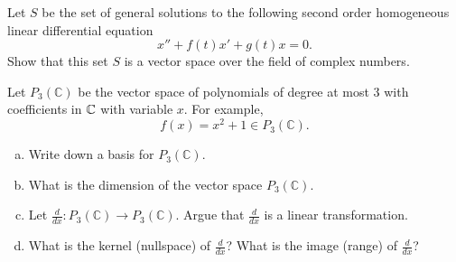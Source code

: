 \documentclass[12pt]{article} %
\begin{document}
\begin{problem}
Let $S$ be the set of general solutions to the following second order homogeneous linear differential equation
\[
x''+f(t)x'+g(t)x=0.
\]
Show that this set $S$ is a vector space over the field of complex numbers.
\end{problem}
\vspace*{0.5cm}

\begin{problem}
Let $P_3(\mathbb{C})$ be the vector space of polynomials of degree at most 3 with coefficients in $\mathbb{C}$ with variable $x$. For example,
\[
f(x)= x^2+1 \in P_3(\mathbb{C}).
\]
\begin{enumerate}[(a)]
    \item Write down a basis for $P_3(\mathbb{C})$.
    \item What is the dimension of the vector space $P_3(\mathbb{C})$.
    \item Let $\frac{d}{dx} \colon P_3(\mathbb{C}) \to P_3(\mathbb{C})$. Argue that $\frac{d}{dx}$ is a linear transformation.
    \item What is the kernel (nullspace) of $\frac{d}{dx}$? What is the image (range) of $\frac{d}{dx}$?
\end{enumerate}
\end{problem}
\end{document}
